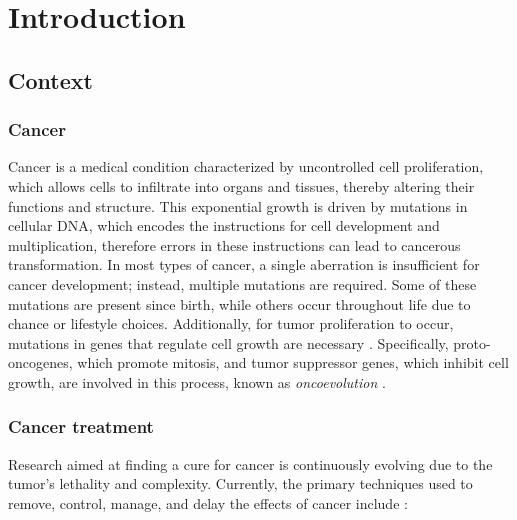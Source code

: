 \chapter{Introduction} \label{chap:introduction}

\section{Context}

\subsection{Cancer}

Cancer is a medical condition characterized by uncontrolled cell proliferation, which allows cells to infiltrate into organs and tissues, thereby altering their functions and structure. This exponential growth is driven by mutations in cellular DNA, which encodes the instructions for cell development and multiplication, therefore errors in these instructions can lead to cancerous transformation. In most types of cancer, a single aberration is insufficient for cancer development; instead, multiple mutations are required. Some of these mutations are present since birth, while others occur throughout life due to chance or lifestyle choices. Additionally, for tumor proliferation to occur, mutations in genes that regulate cell growth are necessary \cite{Vogelstein2004}. Specifically, proto-oncogenes, which promote mitosis, and tumor suppressor genes, which inhibit cell growth, are involved in this process, known as \textit{oncoevolution} \cite{carcinogenesis}. 

\subsection{Cancer treatment}

Research aimed at finding a cure for cancer is continuously evolving due to the tumor's lethality and complexity. Currently, the primary techniques used to remove, control, manage, and delay the effects of cancer include \cite{cancer_treat}:

